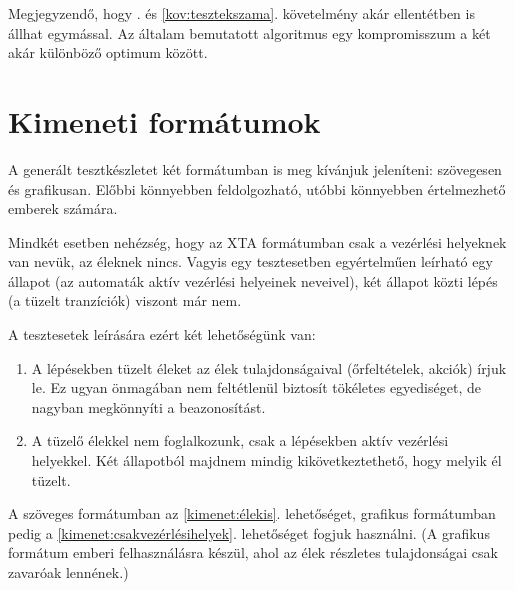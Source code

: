 Megjegyzendő, hogy . és \ref{kov:tesztekszama}. követelmény akár ellentétben is állhat egymással. Az általam bemutatott algoritmus egy kompromisszum a két akár különböző optimum között.

\section{Kimeneti formátumok} \label{kimenet}

A generált tesztkészletet két formátumban is meg kívánjuk jeleníteni: szövegesen és grafikusan. Előbbi könnyebben feldolgozható, utóbbi könnyebben értelmezhető emberek számára.

Mindkét esetben nehézség, hogy az XTA formátumban csak a vezérlési helyeknek van nevük, az éleknek nincs. Vagyis egy tesztesetben egyértelműen leírható egy állapot (az automaták aktív vezérlési helyeinek neveivel), két állapot közti lépés (a tüzelt tranzíciók) viszont már nem.

A tesztesetek leírására ezért két lehetőségünk van:
\begin{enumerate}
    \item A lépésekben tüzelt éleket az élek tulajdonságaival (őrfeltételek, akciók) írjuk le. Ez ugyan önmagában nem feltétlenül biztosít tökéletes egyediséget, de nagyban megkönnyíti a beazonosítást. \label{kimenet:élekis}
    \item A tüzelő élekkel nem foglalkozunk, csak a lépésekben aktív vezérlési helyekkel. Két állapotból majdnem mindig kikövetkeztethető, hogy melyik él tüzelt. \label{kimenet:csakvezérlésihelyek}
\end{enumerate}

A szöveges formátumban az \ref{kimenet:élekis}. lehetőséget, grafikus formátumban pedig a \ref{kimenet:csakvezérlésihelyek}. lehetőséget fogjuk használni. (A grafikus formátum emberi felhasználásra készül, ahol az élek részletes tulajdonságai csak zavaróak lennének.)
